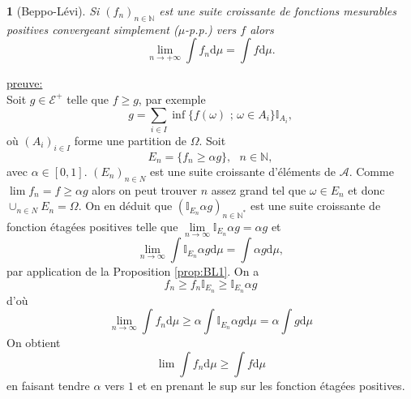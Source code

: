 \documentclass[8pt,notheorems]{beamer}
\def \N{\mathbb N}
\def \Om{\Omega}
\def \om{\omega}
\newtheorem{theorem}{\translate{Theorem}}[section]
\newtheorem{theorem}{\translate{Theoreme}}
\theoremstyle{definition}
\theoremstyle{example}
\theoremstyle{mystyle}
\theoremstyle{plain}
\begin{document}
\begin{frame}[allowframebreaks]
\begin{theorem}[Beppo-Lévi]
Si $(f_n)_{n\in\N}$ est une suite croissante de fonctions mesurables positives convergeant simplement ($\mu$-p.p.) vers $f$ alors
$$
\underset{n\rightarrow+\infty}{\lim}\int f_n\text{d}\mu=\int f\text{d}\mu.
$$
\end{theorem}
\underline{preuve:}\\

Soit $g\in \mathcal{E}^+$ telle que $f\geq g$, par exemple
$$
g=\sum_{i\in I} \inf\{f(\om)\text{ ; }\om\in A_i\}\mathbb{I}_{A_i},
$$
où $(A_i)_{i\in I}$ forme une partition de $\Om$. Soit
$$
E_n=\{f_n\geq\alpha g\},\text{ }n\in\N,
$$
avec $\alpha\in[0,1]$. $(E_n)_{n\in N}$ est une suite croissante d'éléments de $\mathcal{A}$. Comme $\lim f_n = f\geq \alpha g$ alors on peut trouver $n$ assez grand tel que $\om\in E_n$ et donc $\cup_{n\in N}E_n=\Om$. On en déduit que $(\mathbb{I}_{E_n}\alpha g)_{n\in\N^\ast}$ est une suite croissante de fonction étagées positives telle que $\underset{n\rightarrow \infty}{\lim} \mathbb{I}_{E_n}\alpha g = \alpha g$ et 
$$
\underset{n\rightarrow \infty}{\lim}\int \mathbb{I}_{E_n}\alpha g\text{d}\mu=\int \alpha g\text{d}\mu,
$$
par application de la Proposition \ref{prop:BL1}. On a
$$
f_n\geq f_n\mathbb{I}_{E_n}\geq \mathbb{I}_{E_n} \alpha g
$$
d'où
$$
\underset{n\rightarrow \infty}{\lim}\int f_n\text{d}\mu\geq\alpha \int \mathbb{I}_{E_n} \alpha g\text{d}\mu=\alpha \int  g\text{d}\mu
$$
On obtient
$$
\lim\int f_n\text{d}\mu\geq \int f\text{d}\mu
$$
en faisant tendre $\alpha$ vers $1$ et en prenant le sup sur les fonction étagées positives.
\end{frame}
\end{document}
